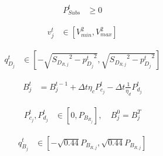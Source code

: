 \documentclass[../../outputs/main.tex]{subfiles}
\begin{document}
\begin{align}
    {P^t_{Subs}} &\geq {0} \label{eq:substationRealPowerLimits} &&
\end{align}

\vspace{-2.0em} %



\begin{align}
    { v^{t}_{j} } &\in { \left[ V^{2}_{min}, V^{2}_{max} \right]} \label{eq:lim_vj} &&
\end{align}

\vspace{-1.5em} %

\begin{align}
    { q^{t}_{D_{j}} } 
    &\in
    { \left[-\sqrt{ {S_{D_{R, j}}}^2 - {p^{t}_{D_{j}}}^2}, \sqrt{ {S_{D_{R, j}}}^2 - {p^{t}_{D_{j}}}^2}\right] } \label{eq:qDj} &&
\end{align}

\vspace{-1.5em} %

\begin{align}
    {B_{j}^{t}} &= {B_{j}^{t-1} + \Delta t  \eta_c P_{c_j}^t - \Delta t\frac{1}{\eta_d} P_{d_j}^t } \label{eq:SOC-j} &&
\end{align}

\vspace{-1.5em} %

\begin{align}
    { P^{t}_{c_{j}}, P^{t}_{d_{j}} }
    &\in
    { \left[ 0, P_{B_{R_{j}}} \right]}, \quad B_{j}^{0}=B_{j}^{T} \label{eq:lim_PcPdj} &&
\end{align}

\vspace{-1.5em} %

\begin{align}
    { q^{t}_{B_{j}} } 
    &\in 
    { \left[-\sqrt{0.44}P_{B_{R, j}}, \sqrt{0.44}P_{B_{R, j}}\right] } \label{eq:qBj} &&
\end{align}
\end{document}
